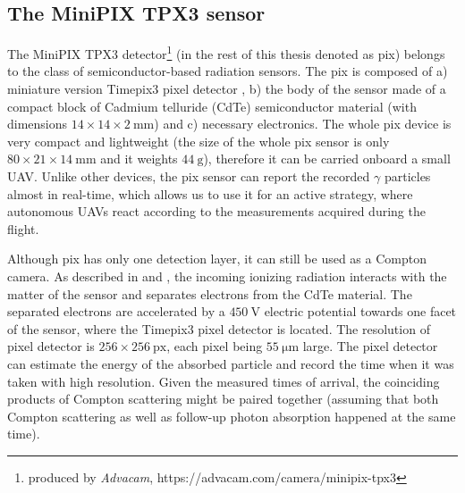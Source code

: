 \subsection{The MiniPIX TPX3 sensor} %
The MiniPIX TPX3 detector\footnote{produced by \textit{Advacam}, https://advacam.com/camera/minipix-tpx3} (in the rest of this thesis denoted as \ac{pix}) belongs to the class of semiconductor-based radiation sensors.
The \ac{pix} is composed of a) miniature version Timepix3 pixel detector \cite{timepix3},
b) the body of the sensor made of a compact block of Cadmium telluride (CdTe) semiconductor material (with dimensions $14 \times 14 \times 2 \ \si{\milli\meter}$) 
and c) necessary electronics.
The whole \ac{pix} device is very compact and lightweight (the size of the whole \ac{pix} sensor is only $80 \times 21 \times 14 \ \si{\milli\meter}$ and it weights $\SI{44}{\gram}$), therefore it can be carried onboard a small \ac{UAV}.
Unlike other devices, the \ac{pix} sensor can report the recorded $\gamma$ particles almost in real-time, which allows us to use it for an active strategy, where autonomous \ac{UAV}s react according to the measurements acquired during the flight.

Although \ac{pix} has only one detection layer, it can still be used as a Compton camera.
As described in \cite{baca2021gamma} and \cite{baca2019timepix}, the incoming ionizing radiation interacts with the matter of the sensor and separates electrons from the CdTe material.
The separated electrons are accelerated by a $\SI{450}{\volt}$ electric potential towards one facet of the sensor, where the Timepix3 pixel detector is located.
The resolution of pixel detector is $256 \times 256\ \mathrm{px}$, each pixel being $55\ \si{\micro\meter}$ large.
The pixel detector can estimate the energy of the absorbed particle and record the time when it was taken with high resolution.
Given the measured times of arrival, the coinciding products of Compton scattering might be paired together (assuming that both Compton scattering as well as follow-up photon absorption happened at the same time).

